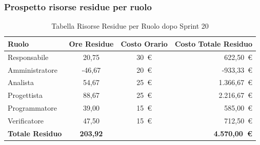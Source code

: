 \subsubsection{Prospetto risorse residue per ruolo}
\begin{table}[H]
    \centering
    \renewcommand{\arraystretch}{1.3}
    \begin{tabularx}{\textwidth}{|X|c|c|r|}
        \hline
        \textbf{Ruolo} & \textbf{Ore Residue} & \textbf{Costo Orario} &
        \textbf{Costo Totale Residuo} \\
        \hline
        Responsabile   & 20,75 & 30~\euro & 622{,}50~\euro \\
        Amministratore & -46,67 & 20~\euro & -933{,}33~\euro \\
        Analista       & 54,67 & 25~\euro & 1.366{,}67~\euro \\
        Progettista    & 88,67 & 25~\euro & 2.216{,}67~\euro \\
        Programmatore  & 39,00 & 15~\euro & 585{,}00~\euro \\
        Verificatore   & 47,50 & 15~\euro & 712{,}50~\euro \\
        \hline
        \textbf{Totale Residuo} & \textbf{203,92} & &
        \textbf{4.570{,}00~\euro} \\
        \hline
    \end{tabularx}
    \caption{Tabella Risorse Residue per Ruolo dopo Sprint 20}
\end{table}

